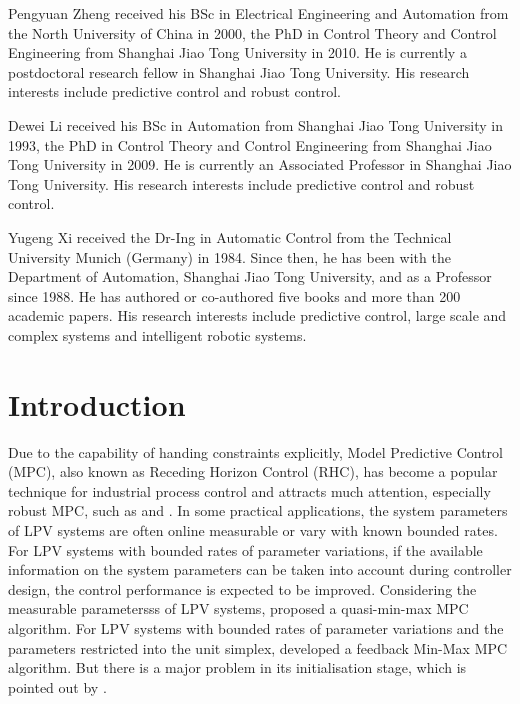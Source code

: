 \documentclass{singlecol-new}
\theoremstyle{TH}{
\newtheorem{lemma}{Lemma}
\newtheorem{theorem}[lemma]{Theorem}
\newtheorem{corrolary}[lemma]{Corrolary}
\newtheorem{conjecture}[lemma]{Conjecture}
\newtheorem{proposition}[lemma]{Proposition}
\newtheorem{claim}[lemma]{Claim}
\newtheorem{stheorem}[lemma]{Wrong Theorem}
\newtheorem{algorithm}{Algorithm}
}
\theoremstyle{THrm}{
\newtheorem{definition}{Definition}[section]
\newtheorem{question}{Question}[section]
\newtheorem{remark}{Remark}
\newtheorem{scheme}{Scheme}
}
\theoremstyle{THhit}{
\newtheorem{case}{Case}[section]
}
\begin{document}
\begin{bio}
Pengyuan Zheng received his BSc in Electrical Engineering and
Automation from the North University of China in 2000, the PhD in
Control Theory and Control Engineering from Shanghai Jiao Tong
University in 2010. He is currently a postdoctoral research fellow
in Shanghai Jiao Tong University. His research interests include
predictive control and robust control.

\noindent Dewei Li received his BSc in Automation from Shanghai Jiao
Tong University in 1993, the PhD in Control Theory and Control
Engineering from Shanghai Jiao Tong University in 2009. He is
currently an Associated Professor in Shanghai Jiao Tong University.
His research interests include predictive control and robust
control.

\noindent Yugeng Xi received the Dr-Ing in Automatic Control from
the Technical University Munich (Germany) in 1984. Since then, he has
been with the Department of Automation, Shanghai Jiao Tong
University, and as a \pagebreak Professor since 1988. He has
authored or co-authored five books and more than 200 academic
papers. His research interests include predictive control, large
scale and complex systems and intelligent robotic systems.
\end{bio}

\maketitle

\section{Introduction}

Due to the capability of handing constraints explicitly, Model
Predictive Control (MPC), also known as Receding Horizon Control
(RHC), has become a popular technique for industrial process control
and attracts much attention, especially robust MPC, such as
\cite{Kothare} and \cite{li2009constrained}. In some practical
applications, the system parameters of LPV systems are often online
measurable or vary with known bounded rates. For LPV systems with
bounded rates of parameter variations, if the available information
on the system parameters can be taken into account during controller
design, the control performance is expected to be improved.
Considering the measurable parametersss of LPV systems,
\cite{lu2000quasi} proposed a quasi-min-max MPC algorithm. For LPV
systems with bounded rates of parameter variations and the
parameters restricted into the unit simplex, \cite{casavola2002fmm}
developed a feedback Min-Max MPC algorithm. But there is a major
problem in its initialisation stage, which is pointed out by
\cite{ding2007cfm}.
\end{document}
